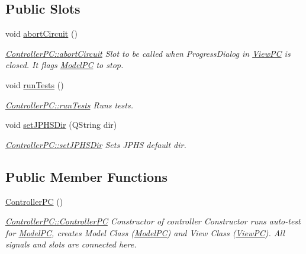 \subsection*{Public Slots}
\begin{DoxyCompactItemize}
\item 
void \hyperlink{class_controller_p_c_a8814989f7be1214e06b2e720889066b0}{abort\+Circuit} ()
\begin{DoxyCompactList}\small\item\em \hyperlink{class_controller_p_c_a8814989f7be1214e06b2e720889066b0}{Controller\+P\+C\+::abort\+Circuit} Slot to be called when Progress\+Dialog in \hyperlink{class_view_p_c}{View\+PC} is closed. It flags \hyperlink{class_model_p_c}{Model\+PC} to stop. \end{DoxyCompactList}\item 
void \hyperlink{class_controller_p_c_aaa59fc90e1ef731eee4560ec87e43707}{run\+Tests} ()
\begin{DoxyCompactList}\small\item\em \hyperlink{class_controller_p_c_aaa59fc90e1ef731eee4560ec87e43707}{Controller\+P\+C\+::run\+Tests} Runs tests. \end{DoxyCompactList}\item 
void \hyperlink{class_controller_p_c_ac00d29685a7e5b780c01eb438e10f96d}{set\+J\+P\+H\+S\+Dir} (Q\+String dir)
\begin{DoxyCompactList}\small\item\em \hyperlink{class_controller_p_c_ac00d29685a7e5b780c01eb438e10f96d}{Controller\+P\+C\+::set\+J\+P\+H\+S\+Dir} Sets J\+P\+HS default dir. \end{DoxyCompactList}\end{DoxyCompactItemize}
\subsection*{Public Member Functions}
\begin{DoxyCompactItemize}
\item 
\hyperlink{class_controller_p_c_afa6c92d67bf3b6531c42385fc5938003}{Controller\+PC} ()
\begin{DoxyCompactList}\small\item\em \hyperlink{class_controller_p_c_afa6c92d67bf3b6531c42385fc5938003}{Controller\+P\+C\+::\+Controller\+PC} Constructor of controller Constructor runs auto-\/test for \hyperlink{class_model_p_c}{Model\+PC}, creates Model Class (\hyperlink{class_model_p_c}{Model\+PC}) and View Class (\hyperlink{class_view_p_c}{View\+PC}). All signals and slots are connected here. \end{DoxyCompactList}\end{DoxyCompactItemize}
